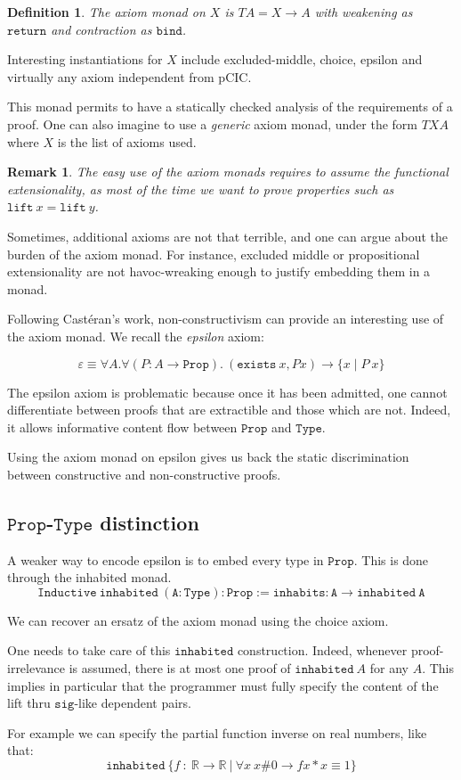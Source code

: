 \documentclass[a4paper,11pt]{article}
\newcommand{\R}{\mathbb{R}}
\newtheorem{definition}{Definition}
\newtheorem{remark}{Remark}
\theoremstyle{definition}
\theoremstyle{remark}
\begin{document}
  \begin{definition}
    The axiom monad on $X$ is $T A = X \rightarrow A$ with weakening as $\mathtt{return}$ and contraction as $\mathtt{bind}$.
  \end{definition}

  Interesting instantiations for $X$ include excluded-middle, choice, epsilon and virtually any axiom independent from pCIC.

  This monad permits to have a statically checked analysis of the requirements of a proof. One can also imagine to use a \emph{generic} axiom monad, under the form $T X A$ where $X$ is the list of axioms used.

  \begin{remark}
    The easy use of the axiom monads requires to assume the functional extensionality, as most of the time we want to prove properties such as $\mathtt{lift}\ x = \mathtt{lift}\ y$.
  \end{remark} %

  Sometimes, additional axioms are not that terrible, and one can argue about the burden of the axiom monad. For instance, excluded middle or propositional extensionality are not havoc-wreaking enough to justify embedding them in a monad.

  Following Castéran's work, non-constructivism can provide an interesting use of the axiom monad. We recall the \emph{epsilon} axiom:

$$\varepsilon ≡ \forall A.\forall (P : A\rightarrow  \mathtt{Prop}).\ (\mathtt{exists}\ x, P x) \rightarrow \{x\mid P\  x\}$$

  The epsilon axiom is problematic because once it has been admitted, one cannot differentiate between proofs that are extractible and those which are not. Indeed, it allows informative content flow between $\mathtt{Prop}$ and $\mathtt{Type}$.

  Using the axiom monad on epsilon gives us back the static discrimination between constructive and non-constructive proofs.

\subsection{$\mathtt{Prop}$-$\mathtt{Type}$ distinction}

  A weaker way to encode epsilon is to embed every type in $\mathtt{Prop}$. This is done through the inhabited monad.
  $$\mathtt{Inductive\ inhabited\ (A : Type) : Prop :=  inhabits : A \rightarrow inhabited\ A}$$

  We can recover an ersatz of the axiom monad using the choice axiom.

  One needs to take care of this $\mathtt{inhabited}$ construction. Indeed, whenever proof-irrelevance is assumed, there is at most one proof of $\mathtt{inhabited}\ A$ for any $A$. This implies in particular that the programmer must fully specify the content of the lift thru $\mathtt{sig}$-like dependent pairs.

  For example we can specify the partial function inverse on real numbers, like that:
  $$\mathtt{inhabited}\ \{f\ :\ \R → \R\ |\ \forall x\ x \# 0 → f x * x ≡ 1\}$$

  
  
\end{document}
